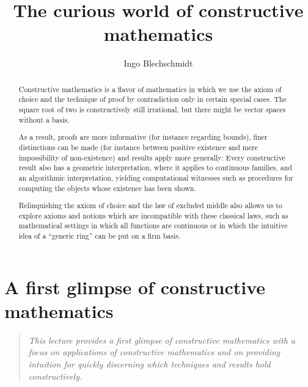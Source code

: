 \documentclass[10pt,reqno,a4paper,openany]{amsbook}
\title{The curious world of constructive mathematics}
\author{Ingo Blechschmidt}
\theoremstyle{definition}
\theoremstyle{plain}
\theoremstyle{remark}
\newcommand{\?}{\,{:}\,}
\renewcommand{\_}{\mathpunct{.}\,}
\newenvironment{intro}{\begin{quote}}{\end{quote}\bigskip}
\begin{document}
\begin{abstract}
Constructive mathematics is a flavor of mathematics in which we use the
axiom of choice and the technique of proof by contradiction only in
certain special cases. The square root of two is constructively still
irrational, but there might be vector spaces without a basis.

As a result, proofs are more informative (for instance regarding
bounds), finer distinctions can be made (for instance between positive
existence and mere impossibility of non-existence) and results apply
more generally: Every constructive result also has a geometric
interpretation, where it applies to continuous families, and an
algorithmic interpretation, yielding computational witnesses such as
procedures for computing the objects whose existence has been shown.

Relinquishing the axiom of choice and the law of excluded middle also
allows us to explore axioms and notions which are incompatible with
these classical laws, such as mathematical settings in which all
functions are continuous or in which the intuitive idea of a ``generic
ring'' can be put on a firm basis.
\end{abstract}

{
\renewcommand{\newpage}{\ }
\renewcommand{\vfill}{\ }
\renewcommand{\vfil}{\ }
\maketitle
}

\setcounter{tocdepth}{1}
{
\renewcommand{\newpage}{\ }
\tableofcontents
}


\chapter{A first glimpse of constructive mathematics}

\begin{intro}
\it
This lecture provides a first glimpse of constructive mathematics with a
focus on applications of constructive mathematics and on providing
intuition for quickly discerning which techniques and results hold
constructively.
\end{intro}
\end{document}
